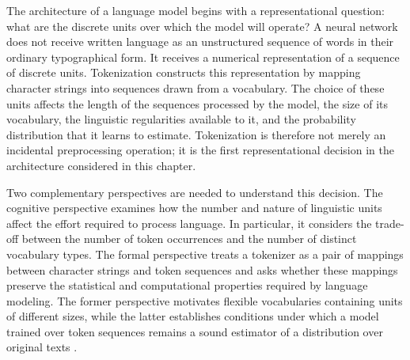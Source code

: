 
The architecture of a language model begins with a representational question: what are the discrete units over which the model will operate? A neural network does not receive written language as an unstructured sequence of words in their ordinary typographical form. It receives a numerical representation of a sequence of discrete units. Tokenization constructs this representation by mapping character strings into sequences drawn from a vocabulary. The choice of these units affects the length of the sequences processed by the model, the size of its vocabulary, the linguistic regularities available to it, and the probability distribution that it learns to estimate. Tokenization is therefore not merely an incidental preprocessing operation; it is the first representational decision in the architecture considered in this chapter.

Two complementary perspectives are needed to understand this decision. The cognitive perspective examines how the number and nature of linguistic units affect the effort required to process language. In particular, it considers the trade-off between the number of token occurrences and the number of distinct vocabulary types. The formal perspective treats a tokenizer as a pair of mappings between character strings and token sequences and asks whether these mappings preserve the statistical and computational properties required by language modeling. The former perspective motivates flexible vocabularies containing units of different sizes, while the latter establishes conditions under which a model trained over token sequences remains a sound estimator of a distribution over original texts \parencite{yang2024rethinking,gastaldi2025foundations}.


